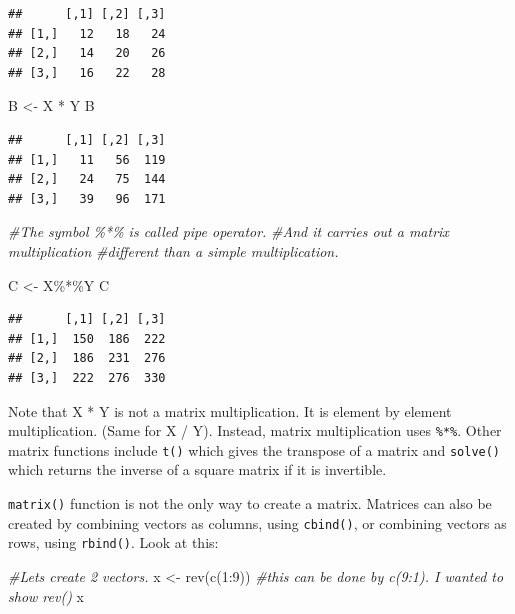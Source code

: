 \documentclass[
]{book}
\newenvironment{Shaded}{\begin{snugshade}}{\end{snugshade}}
\newcommand{\CommentTok}[1]{\textcolor[rgb]{0.56,0.35,0.01}{\textit{#1}}}
\newcommand{\DecValTok}[1]{\textcolor[rgb]{0.00,0.00,0.81}{#1}}
\newcommand{\FunctionTok}[1]{\textcolor[rgb]{0.00,0.00,0.00}{#1}}
\newcommand{\NormalTok}[1]{#1}
\newcommand{\OtherTok}[1]{\textcolor[rgb]{0.56,0.35,0.01}{#1}}
\newcommand{\SpecialCharTok}[1]{\textcolor[rgb]{0.00,0.00,0.00}{#1}}
\theoremstyle{definition}
\theoremstyle{definition}
\theoremstyle{definition}
\theoremstyle{definition}
\theoremstyle{remark}
\begin{document}
\begin{verbatim}
##      [,1] [,2] [,3]
## [1,]   12   18   24
## [2,]   14   20   26
## [3,]   16   22   28
\end{verbatim}

\begin{Shaded}
\begin{Highlighting}[]
\NormalTok{B }\OtherTok{\textless{}{-}}\NormalTok{ X }\SpecialCharTok{*}\NormalTok{ Y}
\NormalTok{B}
\end{Highlighting}
\end{Shaded}

\begin{verbatim}
##      [,1] [,2] [,3]
## [1,]   11   56  119
## [2,]   24   75  144
## [3,]   39   96  171
\end{verbatim}

\begin{Shaded}
\begin{Highlighting}[]
\CommentTok{\#The symbol \%*\% is called pipe operator.}
\CommentTok{\#And it carries out a matrix multiplication}
\CommentTok{\#different than a simple multiplication.}

\NormalTok{C }\OtherTok{\textless{}{-}}\NormalTok{ X}\SpecialCharTok{\%*\%}\NormalTok{Y  }
\NormalTok{C}
\end{Highlighting}
\end{Shaded}

\begin{verbatim}
##      [,1] [,2] [,3]
## [1,]  150  186  222
## [2,]  186  231  276
## [3,]  222  276  330
\end{verbatim}

Note that X * Y is not a matrix multiplication. It is element by element multiplication. (Same for X / Y). Instead, matrix multiplication uses \texttt{\%*\%}. Other matrix functions include \texttt{t()} which gives the transpose of a matrix and \texttt{solve()} which returns the inverse of a square matrix if it is invertible.

\texttt{matrix()} function is not the only way to create a matrix. Matrices can also be created by combining vectors as columns, using \texttt{cbind()}, or combining vectors as rows, using \texttt{rbind()}. Look at this:

\begin{Shaded}
\begin{Highlighting}[]
\CommentTok{\#Let\textquotesingle{}s create 2 vectors.}
\NormalTok{x }\OtherTok{\textless{}{-}} \FunctionTok{rev}\NormalTok{(}\FunctionTok{c}\NormalTok{(}\DecValTok{1}\SpecialCharTok{:}\DecValTok{9}\NormalTok{))  }\CommentTok{\#this can be done by c(9:1). I wanted to show rev()}
\NormalTok{x}
\end{Highlighting}
\end{Shaded}
\end{document}
